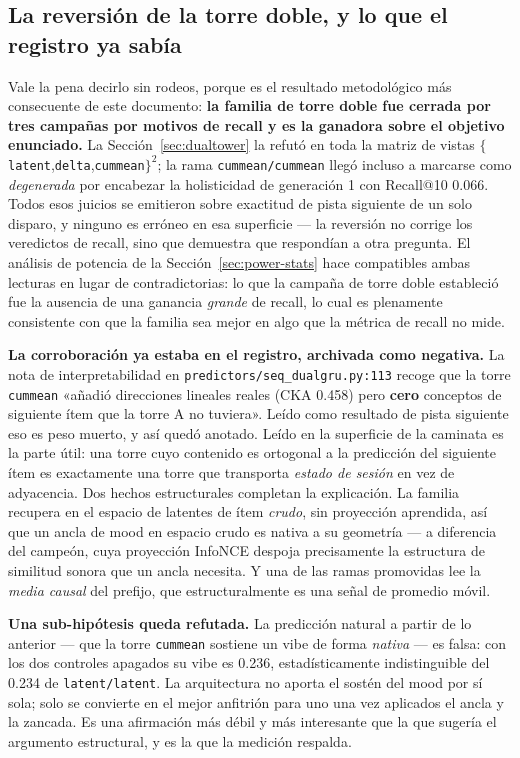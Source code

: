 \documentclass[11pt]{article}
\begin{document}
\subsection{La reversión de la torre doble, y lo que el registro ya sabía}
\label{sec:walk-reversal}
Vale la pena decirlo sin rodeos, porque es el resultado metodológico más
consecuente de este documento: \textbf{la familia de torre doble fue cerrada por
tres campañas por motivos de recall y es la ganadora sobre el objetivo
enunciado.} La Sección~\ref{sec:dualtower} la refutó en toda la matriz de vistas
$\{$\texttt{latent},\texttt{delta},\texttt{cummean}$\}^2$; la rama
\texttt{cummean/cummean} llegó incluso a marcarse como \emph{degenerada} por
encabezar la holisticidad de generación 1 con Recall@10 \num{0.066}. Todos esos
juicios se emitieron sobre exactitud de pista siguiente de un solo disparo, y
ninguno es erróneo en esa superficie --- la reversión no corrige los veredictos
de recall, sino que demuestra que respondían a otra pregunta. El análisis de
potencia de la Sección~\ref{sec:power-stats} hace compatibles ambas lecturas en
lugar de contradictorias: lo que la campaña de torre doble estableció fue la
ausencia de una ganancia \emph{grande} de recall, lo cual es plenamente
consistente con que la familia sea mejor en algo que la métrica de recall no
mide.

\textbf{La corroboración ya estaba en el registro, archivada como negativa.} La
nota de interpretabilidad en \texttt{predictors/seq\_dualgru.py:113} recoge que
la torre \texttt{cummean} «añadió direcciones lineales reales (CKA \num{0.458})
pero \textbf{cero} conceptos de siguiente ítem que la torre A no tuviera».
Leído como resultado de pista siguiente eso es peso muerto, y así quedó
anotado. Leído en la superficie de la caminata es la parte útil: una torre cuyo
contenido es ortogonal a la predicción del siguiente ítem es exactamente una
torre que transporta \emph{estado de sesión} en vez de adyacencia. Dos hechos
estructurales completan la explicación. La familia recupera en el espacio de
latentes de ítem \emph{crudo}, sin proyección aprendida, así que un ancla de
mood en espacio crudo es nativa a su geometría --- a diferencia del campeón,
cuya proyección InfoNCE despoja precisamente la estructura de similitud sonora
que un ancla necesita. Y una de las ramas promovidas lee la \emph{media causal}
del prefijo, que estructuralmente es una señal de promedio móvil.

\textbf{Una sub-hipótesis queda refutada.} La predicción natural a partir de lo
anterior --- que la torre \texttt{cummean} sostiene un vibe de forma
\emph{nativa} --- es falsa: con los dos controles apagados su vibe es
\num{0.236}, estadísticamente indistinguible del \num{0.234} de
\texttt{latent/latent}. La arquitectura no aporta el sostén del mood por sí
sola; solo se convierte en el mejor anfitrión para uno una vez aplicados el
ancla y la zancada. Es una afirmación más débil y más interesante que la que
sugería el argumento estructural, y es la que la medición respalda.
\end{document}
